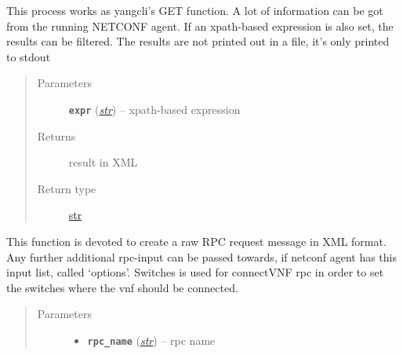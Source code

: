 \documentclass[letterpaper,10pt,english]{sphinxmanual}
\begin{document}
\begin{fulllineitems}
\begin{fulllineitems}
\begin{quote}
\begin{description}
\end{description}\end{quote}

\end{fulllineitems}


\begin{fulllineitems}
\label{util/netconf:escape.util.netconf.AbstractNETCONFAdapter.get}
This process works as yangcli's GET function. A lot of information can be
got from the running NETCONF agent. If an xpath-based expression is also
set, the results can be filtered. The results are not printed out in a
file, it's only printed to stdout
\begin{quote}\begin{description}
\item[{Parameters}] \leavevmode
\textbf{\texttt{expr}} (\href{https://docs.python.org/2.7/library/functions.html\#str}{\emph{str}}) -- xpath-based expression

\item[{Returns}] \leavevmode
result in XML

\item[{Return type}] \leavevmode
\href{https://docs.python.org/2.7/library/functions.html\#str}{str}

\end{description}\end{quote}

\end{fulllineitems}


\begin{fulllineitems}
\label{util/netconf:escape.util.netconf.AbstractNETCONFAdapter._create_rpc_request}
This function is devoted to create a raw RPC request message in XML format.
Any further additional rpc-input can be passed towards, if netconf agent
has this input list, called `options'. Switches is used for connectVNF
rpc in order to set the switches where the vnf should be connected.
\begin{quote}\begin{description}
\item[{Parameters}] \leavevmode\begin{itemize}
\item {} 
\textbf{\texttt{rpc\_name}} (\href{https://docs.python.org/2.7/library/functions.html\#str}{\emph{str}}) -- rpc name


\end{itemize}
\end{description}
\end{quote}
\end{fulllineitems}
\end{fulllineitems}
\end{document}
